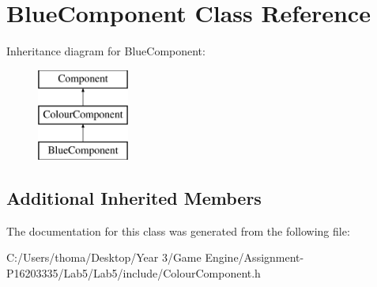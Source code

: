 \hypertarget{class_blue_component}{}\section{Blue\+Component Class Reference}
\label{class_blue_component}
Inheritance diagram for Blue\+Component\+:\begin{figure}[H]
\begin{center}
\leavevmode
\includegraphics[height=3.000000cm]{class_blue_component}
\end{center}
\end{figure}
\subsection*{Additional Inherited Members}


The documentation for this class was generated from the following file\+:\begin{DoxyCompactItemize}
\item 
C\+:/\+Users/thoma/\+Desktop/\+Year 3/\+Game Engine/\+Assignment-\/\+P16203335/\+Lab5/\+Lab5/include/Colour\+Component.\+h\end{DoxyCompactItemize}
